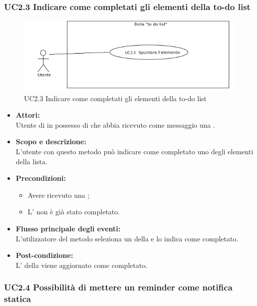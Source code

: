 \subsubsection{UC2.3 Indicare come completati gli elementi della to-do list} \label{UC2.3}

\begin{figure}[H]
	\centering
	\includegraphics[width=15cm]{../../documenti/AnalisiDeiRequisiti/Diagrammi_img/uc2_3.png}
	\caption{UC2.3 Indicare come completati gli elementi della to-do list}
\end{figure}

\begin{itemize}
	\item \textbf{Attori:}
	\\Utente di  in possesso di \ProjectName{} che abbia ricevuto come messaggio una  .
	\item \textbf{Scopo e descrizione:} 
	\\L'utente con questo metodo può indicare come completato uno degli elementi della lista.
	\item \textbf{Precondizioni:}
	\begin{itemize}
		\item Avere ricevuto una  ;
		\item L' non è già stato completato.
	\end{itemize}
	\item \textbf{Flusso principale degli eventi:}
	\\L'utilizzatore del metodo seleziona un  della  e lo indica come completato. 
	\item \textbf{Post-condizione:}
	\\L' della  viene aggiornato come completato.
\end{itemize}

\subsubsection{UC2.4 Possibilità di mettere un reminder come notifica statica} \label{UC2.4}

